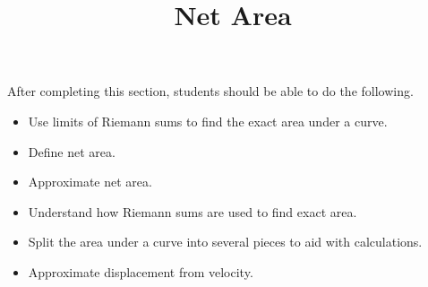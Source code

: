 \documentclass{ximera}
\title{Net Area}
\begin{document}
\begin{abstract}
\end{abstract}

\maketitle

\begin{sectionOutcomes}

After completing this section, students should be able to do the following.

\begin{itemize}
	\item Use limits of Riemann sums to find the exact area under a curve.
	\item Define net area.
	\item Approximate net area.
	\item Understand how Riemann sums are used to find exact area.
	\item Split the area under a curve into several pieces to aid with calculations.
	\item Approximate displacement from velocity.
\end{itemize}

\end{sectionOutcomes}
\end{document}
